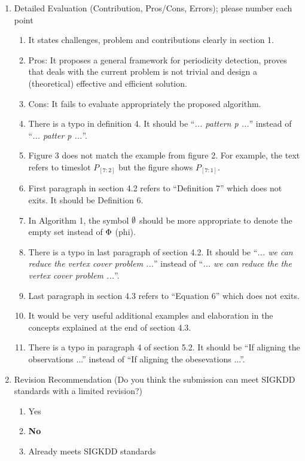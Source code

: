 \documentclass{article}
\begin{document}
\begin{enumerate}
 \item Detailed Evaluation (Contribution, Pros/Cons, Errors); please number each point
 \begin{framed}
  \begin{enumerate}
    \item It states challenges, problem and contributions clearly in section 1.
    \item Pros: It proposes a general framework for periodicity detection, proves that deals with the current problem is not trivial and design a (theoretical) effective and efficient solution.
    \item Cons: It fails to evaluate appropriately the proposed algorithm.
    \item There is a typo in definition 4.  It should be ``\textit{... pattern p ...}'' instead of ``\textit{... patter p ...}''.
    \item Figure 3 does not match the example from figure 2. For example, the text refers to timeslot $P_{[7:2]}$ but the figure shows $P_{[7:1]}$. 
    \item First paragraph in section 4.2 refers to ``Definition 7'' which does not exits.  It should be Definition 6.
    \item In Algorithm 1, the symbol $\boldmath\emptyset$ should be more appropriate to denote the empty set instead of $\boldmath\Phi$ (phi).
    \item There is a typo in last paragraph of section 4.2. It should be  ``\textit{... we can reduce the vertex cover problem ...}'' instead of ``\textit{... we can reduce the the vertex cover problem ...}''.
    \item Last paragraph in section 4.3 refers to ``Equation 6'' which does not exits.
    \item It would be very useful additional examples and elaboration in the concepts explained at the end of section 4.3.
    \item There is a typo in paragraph 4 of section 5.2. It should be ``If aligning the observations ...'' instead of ``If aligning the obesevations ...''.
  \end{enumerate}
 \end{framed}
 
 \item Revision Recommendation (Do you think the submission can meet SIGKDD standards with a limited revision?)
 \begin{enumerate}[I]
  \item Yes
  \item \textbf{No}
  \item Already meets SIGKDD standards
 \end{enumerate}
 

\end{enumerate}
\end{document}
